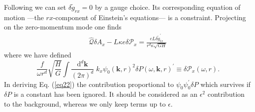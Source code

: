 \documentclass[10pt, oneside]{book}
\begin{document}
\begin{doublespace}
Following \cite{Blake:2013owa} we can set $\delta\tilde{g}_{rx}=0$ by a gauge choice. Its corresponding equation of motion ---the $rx$-component of Einstein's equations--- is a constraint. Projecting on the zero-momentum mode one finds
\begin{align}
  \hat{\mathcal{Q}}\delta A_x - L\kappa e \delta\mathcal{P}_x = \frac{eL\delta \tilde{g}_{tx}^\prime}{r^d\kappa\sqrt{GH}}\label{eq22}
\end{align}
where we have defined \begin{equation}
\frac{f}{\omega r^d}\sqrt{\frac{H}{G}} \int \frac{\mathrm{d}^d\mathbf{k}}{(2\pi)^d}\; k_x\psi_0(\mathbf{k},r)^2 \delta P(\omega,\mathbf{k},r)^\prime \equiv \delta \mathcal{P}_x(\omega, r).  \label{scalareq1}
\end{equation}
In deriving Eq. (\ref{eq22}) the contribution
 proportional to $\psi_0\psi_0^\prime \delta P$ which survives if $\delta P$ is a constant has been ignored. It should be considered as an $\epsilon^2$ contribution to the background, whereas we only keep terms up to $\epsilon$.   %

\end{doublespace}
\end{document}
